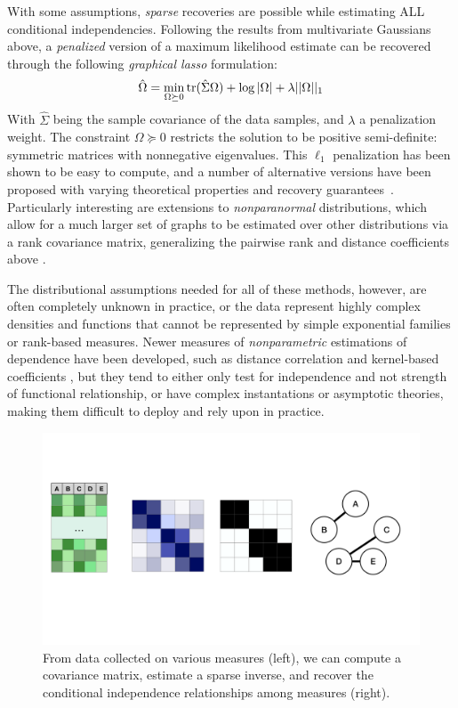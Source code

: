 With some assumptions, \textit{sparse} recoveries are possible while estimating ALL conditional independencies. Following the results from multivariate Gaussians above,
a \textit{penalized} version of a maximum likelihood estimate can be recovered through the following \textit{graphical lasso} \citep{friedman2008sparse} formulation:
\begin{align}\label{eq:glasso}
    \hat{\Omega} = \min_{\Omega \succeq 0} \operatorname{tr}(\hat{\Sigma}\Omega) + \log|\Omega| + \lambda||\Omega||_1
\end{align}
With $\hat{\Sigma}$ being the sample covariance of the data samples, and $\lambda$ a penalization weight. The constraint $\Omega \succeq 0$ restricts the solution to be positive semi-definite: symmetric matrices with nonnegative eigenvalues. This $\ell_1$ penalization has been shown to be easy to compute, and a number of alternative versions have been proposed with varying theoretical properties and recovery guarantees~\citep{cai2011constrained,yuan2010high}.
Particularly interesting are extensions to \textit{nonparanormal} distributions, which allow for a much larger set of graphs to be estimated over other distributions via a rank covariance matrix, generalizing the pairwise rank and distance coefficients above \citep{liu2009nonparanormal,xue2012regularized}.

The distributional assumptions needed for all of these methods, however, are often completely unknown in practice, or the data represent highly complex densities and functions that cannot be represented by simple exponential families or rank-based measures.
Newer measures of \textit{nonparametric} estimations of dependence have been developed, such as distance correlation and kernel-based coefficients \citep{szekely2014partial,wang2015conditional,doran2014permutation}, but they tend to either only test for independence and not strength of functional relationship, or have complex instantations or asymptotic theories, making them difficult to deploy and rely upon in practice.
\begin{figure}
	\includegraphics[width=\textwidth,trim={0 10cm 0 5cm},clip]{2_bknd/graphest.pdf}
	\caption[Graph estimation from data]{From data collected on various measures (left), we can compute a covariance matrix, estimate a sparse inverse, and recover the conditional independence relationships among measures (right).}
	\label{fig:graphest}
\end{figure}


